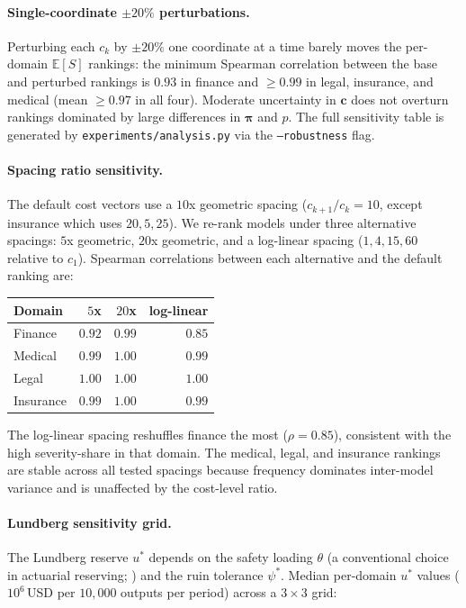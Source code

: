 \documentclass[11pt]{article}
\newcommand{\ES}{\mathbb{E}[S]}
\newcommand{\bpi}{\boldsymbol{\pi}}
\begin{document}
\paragraph{Single-coordinate $\pm 20\%$ perturbations.}
Perturbing each $c_k$ by $\pm 20\%$ one coordinate at a time
barely moves the per-domain $\ES$ rankings: the minimum Spearman
correlation between the base and perturbed rankings is $0.93$ in
finance and $\geq 0.99$ in legal, insurance, and medical (mean
$\geq 0.97$ in all four). Moderate uncertainty in $\mathbf{c}$
does not overturn rankings dominated by large differences in
$\bpi$ and $p$. The full sensitivity table is generated by
\texttt{experiments/analysis.py} via the \texttt{--robustness}
flag.

\paragraph{Spacing ratio sensitivity.}
The default cost vectors use a $10$x geometric spacing
($c_{k+1}/c_k = 10$, except insurance which uses $20, 5, 25$).
We re-rank models under three alternative spacings: $5$x
geometric, $20$x geometric, and a log-linear spacing
($1, 4, 15, 60$ relative to $c_1$). Spearman correlations
between each alternative and the default ranking are:

\begin{center}
\small
\begin{tabular}{lrrr}
\toprule
Domain    & $5$x & $20$x & log-linear \\
\midrule
Finance   & $0.92$ & $0.99$ & $0.85$ \\
Medical   & $0.99$ & $1.00$ & $0.99$ \\
Legal     & $1.00$ & $1.00$ & $1.00$ \\
Insurance & $0.99$ & $1.00$ & $0.99$ \\
\bottomrule
\end{tabular}
\end{center}

\noindent The log-linear spacing reshuffles finance the most
($\rho{=}0.85$), consistent with the high severity-share in that
domain. The medical, legal, and insurance rankings are stable
across all tested spacings because frequency dominates inter-model
variance and is unaffected by the cost-level ratio.

\paragraph{Lundberg sensitivity grid.}
The Lundberg reserve $u^\ast$ depends on the safety loading
$\theta$ (a conventional choice in actuarial reserving;
\citealp{klugman2012loss,dickson2016insurance}) and the ruin
tolerance $\psi^\ast$. Median per-domain $u^\ast$ values
($10^{6}$\,USD per $10{,}000$ outputs per period) across a
$3 \times 3$ grid:
\end{document}
